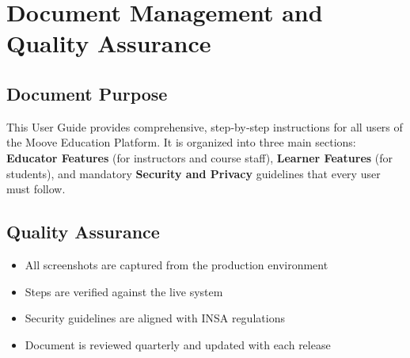 \def\docTitle{User Documentation (User Guide)}
\def\docVersion{3.1}
\def\docDate{July 20, 2026}



\usepackage{enumitem}
\usepackage{colortbl}   %






\tableofcontents
\newpage

\listoffigures
{}
\newpage

\section{Document Management and Quality Assurance}

\subsection{Document Purpose}
This User Guide provides comprehensive, step‑by‑step instructions for all users of the Moove Education Platform. It is organized into three main sections: \textbf{Educator Features} (for instructors and course staff), \textbf{Learner Features} (for students), and mandatory \textbf{Security and Privacy} guidelines that every user must follow.

\subsection{Quality Assurance}
\begin{itemize}
    \item All screenshots are captured from the production environment
    \item Steps are verified against the live system
    \item Security guidelines are aligned with INSA regulations
    \item Document is reviewed quarterly and updated with each release
\end{itemize}

